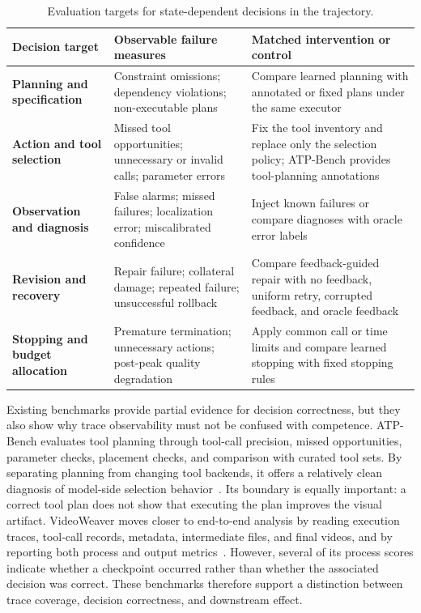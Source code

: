 \begin{table}[t]
  \caption{Evaluation targets for state-dependent decisions in the \AVG{} trajectory.}
  \label{tab:trajectory-evaluation-targets}
  \small
  \setlength{\tabcolsep}{5pt}
  \renewcommand{\arraystretch}{1.08}
  \renewcommand{\tabularxcolumn}[1]{m{#1}}
  \begin{tabularx}{\textwidth}{@{}
    >{\raggedright\arraybackslash\bfseries}m{}
    >{\raggedright\arraybackslash}m{}
    >{\raggedright\arraybackslash}X@{}}
    \toprule
    Decision target & \textbf{Observable failure measures} & \textbf{Matched intervention or control} \\
    \midrule
    Planning and specification & Constraint omissions; dependency violations; non-executable plans & Compare learned planning with annotated or fixed plans under the same executor \\
    \midrule
    Action and tool selection & Missed tool opportunities; unnecessary or invalid calls; parameter errors & Fix the tool inventory and replace only the selection policy; ATP-Bench provides tool-planning annotations~\cite{avg260329902} \\
    \midrule
    Observation and diagnosis & False alarms; missed failures; localization error; miscalibrated confidence & Inject known failures or compare diagnoses with oracle error labels \\
    \midrule
    Revision and recovery & Repair failure; collateral damage; repeated failure; unsuccessful rollback & Compare feedback-guided repair with no feedback, uniform retry, corrupted feedback, and oracle feedback \\
    \midrule
    Stopping and budget allocation & Premature termination; unnecessary actions; post-peak quality degradation & Apply common call or time limits and compare learned stopping with fixed stopping rules \\
    \bottomrule
  \end{tabularx}
\end{table}
\FloatBarrier

Existing benchmarks provide partial evidence for decision correctness, but they also show why trace observability must not be confused with competence. ATP-Bench evaluates tool planning through tool-call precision, missed opportunities, parameter checks, placement checks, and comparison with curated tool sets. By separating planning from changing tool backends, it offers a relatively clean diagnosis of model-side selection behavior~\cite{avg260329902}. Its boundary is equally important: a correct tool plan does not show that executing the plan improves the visual artifact. VideoWeaver moves closer to end-to-end analysis by reading execution traces, tool-call records, metadata, intermediate files, and final videos, and by reporting both process and output metrics~\cite{avg260608091}. However, several of its process scores indicate whether a checkpoint occurred rather than whether the associated decision was correct. These benchmarks therefore support a distinction between trace coverage, decision correctness, and downstream effect.

